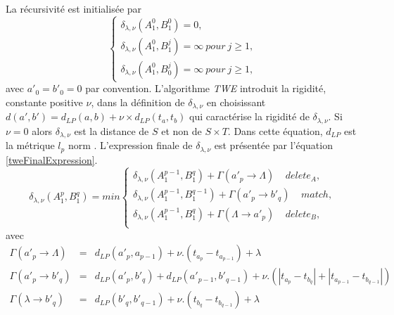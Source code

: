 La r\'ecursivit\'e est initialis\'ee par 
  \[  
 	\begin{cases}
 	\delta_{\lambda,\nu}(A_1^0, B_1^0) = 0, \\
 	\delta_{\lambda,\nu}(A_1^0, B_1^j) = \infty ~pour~ j \ge 1, \\
 	\delta_{\lambda,\nu}(A_1^0, B_0^j) = \infty ~pour~ j \ge 1,
 	\end{cases}
 \]
 avec $a'_0 = b'_0 = 0$ par convention.
 \newline
L'algorithme {\em TWE} introduit la rigidit\'e,  constante positive $\nu$, dans la d\'efinition de $\delta_{\lambda, \nu}$ en choisissant $d(a', b') = d_{LP}(a,b) + \nu \times d_{LP}(t_a,t_b)$ qui caract\'erise la rigidit\'e de $\delta_{\lambda, \nu}$.
Si $\nu = 0$ alors $\delta_{\lambda, \nu}$ est la distance de $S$ et non de $S \times T$.
Dans cette \'equation, $d_{LP}$ est la m\'etrique $l_p$ norm \cite{chen2004marriageLpNorm}.
L'expression finale de $\delta_{\lambda, \nu}$ est pr\'esent\'ee par l'\'equation \ref{tweFinalExpression}.
\begin{equation}
	\delta_{\lambda,\nu}(A_1^p, B_1^q) = min
	\begin{cases}
		\delta_{\lambda,\nu}(A_1^{p-1}, B_1^q) + \Gamma(a'_p \rightarrow \Lambda) ~~~~~ delete_A, \\
		 \delta_{\lambda,\nu}(A_1^{p-1}, B_1^{q-1}) + \Gamma(a'_p \rightarrow b'_q) ~~~~~ match, \\
		 \delta_{\lambda,\nu}(A_1^{p-1}, B_1^q) + \Gamma(\Lambda \rightarrow a'_p) ~~~~~ delete_B, \\
	\end{cases}
	\label{tweFinalExpression}
\end{equation} 
avec 
 \[
	\begin{array}{lcl} 
	\Gamma(a'_p \rightarrow \Lambda) &=& d_{LP}(a'_p, a_{p-1}) +\nu . (t_{a_p} - t_{a_{p-1}}) +\lambda \\  
	\Gamma(a'_p \rightarrow b'_q) &=& d_{LP}(a'_p, b'_{q}) + d_{LP}(a'_{p-1}, b'_{q-1}) + \nu . ( |t_{a_p} - t_{b_{q}}| +  |t_{a_{p-1}} - t_{b_{q-1}}|)  \\ 
	\Gamma( \lambda \rightarrow b'_q) &=& d_{LP}(b'_q, b'_{q-1}) + \nu . (t_{b_q} - t_{b_{q-1}}) + \lambda
	\end{array}
\]	

